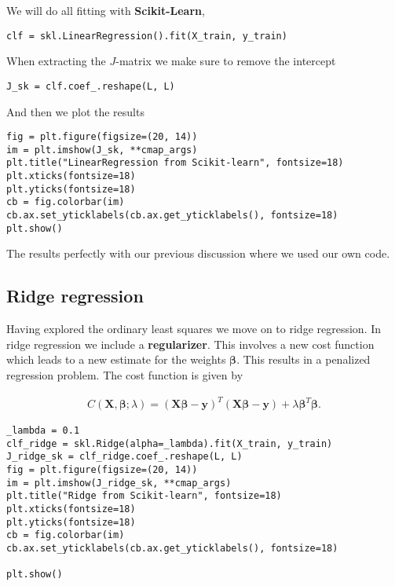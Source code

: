 \documentclass[%
oneside,                 %
final,                   %
10pt]{article}
\begin{document}
We will do all fitting with \textbf{Scikit-Learn},

\begin{verbatim}
clf = skl.LinearRegression().fit(X_train, y_train)
\end{verbatim}
When  extracting the $J$-matrix we make sure to remove the intercept
\begin{verbatim}
J_sk = clf.coef_.reshape(L, L)
\end{verbatim}
And then we plot the results
\begin{verbatim}
fig = plt.figure(figsize=(20, 14))
im = plt.imshow(J_sk, **cmap_args)
plt.title("LinearRegression from Scikit-learn", fontsize=18)
plt.xticks(fontsize=18)
plt.yticks(fontsize=18)
cb = fig.colorbar(im)
cb.ax.set_yticklabels(cb.ax.get_yticklabels(), fontsize=18)
plt.show()
\end{verbatim}
The results perfectly with our previous discussion where we used our own code.

\subsection*{Ridge regression}

Having explored the ordinary least squares we move on to ridge
regression. In ridge regression we include a \textbf{regularizer}. This
involves a new cost function which leads to a new estimate for the
weights $\bm{\beta}$. This results in a penalized regression problem. The
cost function is given by

\begin{align}
    C(\bm{X}, \bm{\beta}; \lambda) = (\bm{X}\bm{\beta} - \bm{y})^T(\bm{X}\bm{\beta} - \bm{y}) + \lambda \bm{\beta}^T\bm{\beta}.
\end{align}
\begin{verbatim}
_lambda = 0.1
clf_ridge = skl.Ridge(alpha=_lambda).fit(X_train, y_train)
J_ridge_sk = clf_ridge.coef_.reshape(L, L)
fig = plt.figure(figsize=(20, 14))
im = plt.imshow(J_ridge_sk, **cmap_args)
plt.title("Ridge from Scikit-learn", fontsize=18)
plt.xticks(fontsize=18)
plt.yticks(fontsize=18)
cb = fig.colorbar(im)
cb.ax.set_yticklabels(cb.ax.get_yticklabels(), fontsize=18)

plt.show()
\end{verbatim}
\end{document}
